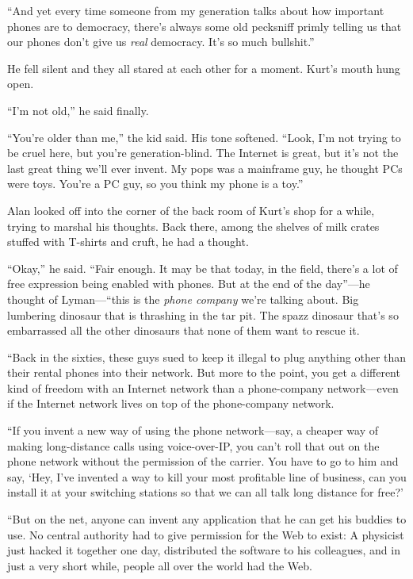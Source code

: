 \documentclass{article}
\begin{document}
``And yet every time someone from my generation talks about how
important phones are to democracy, there's always some old pecksniff
primly telling us that our phones don't give us \textit{real}
democracy.  It's so much bullshit.''

He fell silent and they all stared at each other for a moment.  Kurt's
mouth hung open.

``I'm not old,'' he said finally.

``You're older than me,'' the kid said.  His tone softened.  ``Look,
I'm not trying to be cruel here, but you're generation-blind.  The
Internet is great, but it's not the last great thing we'll ever
invent.  My pops was a mainframe guy, he thought PCs were toys. 
You're a PC guy, so you think my phone is a toy.''

Alan looked off into the corner of the back room of Kurt's shop for a
while, trying to marshal his thoughts.  Back there, among the shelves
of milk crates stuffed with T-shirts and cruft, he had a thought.

``Okay,'' he said.  ``Fair enough.  It may be that today, in the
field, there's a lot of free expression being enabled with phones. 
But at the end of the day''---he thought of Lyman---``this is the
\textit{phone company} we're talking about.  Big lumbering dinosaur
that is thrashing in the tar pit.  The spazz dinosaur that's so
embarrassed all the other dinosaurs that none of them want to rescue
it.

``Back in the sixties, these guys sued to keep it illegal to plug
anything other than their rental phones into their network.  But more
to the point, you get a different kind of freedom with an Internet
network than a phone-company network---even if the Internet network
lives on top of the phone-company network.

``If you invent a new way of using the phone network---say, a cheaper
way of making long-distance calls using voice-over-IP, you can't roll
that out on the phone network without the permission of the carrier. 
You have to go to him and say, `Hey, I've invented a way to kill your
most profitable line of business, can you install it at your switching
stations so that we can all talk long distance for free?'

``But on the net, anyone can invent any application that he can get
his buddies to use.  No central authority had to give permission for
the Web to exist:  A physicist just hacked it together one day,
distributed the software to his colleagues, and in just a very short
while, people all over the world had the Web.
\end{document}
